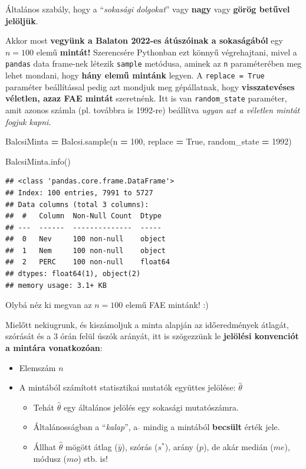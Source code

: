 \documentclass[
]{book}
\newenvironment{Shaded}{\begin{snugshade}}{\end{snugshade}}
\newcommand{\DecValTok}[1]{\textcolor[rgb]{0.00,0.00,0.81}{#1}}
\newcommand{\NormalTok}[1]{#1}
\newcommand{\OperatorTok}[1]{\textcolor[rgb]{0.81,0.36,0.00}{\textbf{#1}}}
\newcommand{\VariableTok}[1]{\textcolor[rgb]{0.00,0.00,0.00}{#1}}
\providecommand{\tightlist}{%
  \setlength{\itemsep}{0pt}\setlength{\parskip}{0pt}}
\begin{document}
Általános szabály, hogy a ``\emph{sokasági dolgokat}'' vagy \textbf{nagy} vagy \textbf{görög betűvel jelöljük}.

Akkor most \textbf{vegyünk a Balaton 2022-es átúszóinak a sokaságából} egy \(n=100\) elemű \textbf{mintát!} Szerencsére Pythonban ezt könnyű végrehajtani, mivel a \texttt{pandas} data frame-nek létezik \texttt{sample} metódusa, aminek az \texttt{n} paraméterében meg lehet mondani, hogy \textbf{hány elemű mintánk} legyen. A \texttt{replace\ =\ True} paraméter beállítással pedig azt mondjuk meg gépállatnak, hogy \textbf{visszatevéses véletlen, azaz FAE mintát} szeretnénk.
Itt is van \texttt{random\_state} paraméter, amit azonos számla (pl. továbbra is 1992-re) beállítva \emph{ugyan azt a véletlen mintát fogjuk kapni}.

\begin{Shaded}
\begin{Highlighting}[]
\NormalTok{BalcsiMinta }\OperatorTok{=}\NormalTok{ Balcsi.sample(n }\OperatorTok{=} \DecValTok{100}\NormalTok{, replace }\OperatorTok{=} \VariableTok{True}\NormalTok{, random\_state }\OperatorTok{=} \DecValTok{1992}\NormalTok{)}

\NormalTok{BalcsiMinta.info()}
\end{Highlighting}
\end{Shaded}

\begin{verbatim}
## <class 'pandas.core.frame.DataFrame'>
## Index: 100 entries, 7991 to 5727
## Data columns (total 3 columns):
##  #   Column  Non-Null Count  Dtype  
## ---  ------  --------------  -----  
##  0   Nev     100 non-null    object 
##  1   Nem     100 non-null    object 
##  2   PERC    100 non-null    float64
## dtypes: float64(1), object(2)
## memory usage: 3.1+ KB
\end{verbatim}

Olybá néz ki megvan az \(n=100\) elemű FAE mintánk! :)

Mielőtt nekiugrunk, és kiszámoljuk a minta alapján az időeredmények átlagát, szórását és a 3 órán felül úszók arányát, itt is szögezzünk le \textbf{jelölési konvenciót a mintára vonatkozóan}:

\begin{itemize}
\tightlist
\item
  Elemszám \(n\)
\item
  A mintából számított statisztikai mutatók együttes jelölése: \(\hat{\theta}\)

  \begin{itemize}
  \tightlist
  \item
    Tehát \(\hat{\theta}\) egy általános jelölés egy sokasági mutatószámra.
  \item
    Általánosságban a ``\emph{kalap}'', a \(\hat{}\) mindig a mintából \textbf{becsült} érték jele.
  \item
    Állhat \(\hat{\theta}\) mögött átlag (\(\bar{y}\)), szórás (\(s^*\)), arány (\(p\)), de akár medián (\(me\)), módusz (\(mo\)) stb. is!
  \end{itemize}
\end{itemize}
\end{document}

